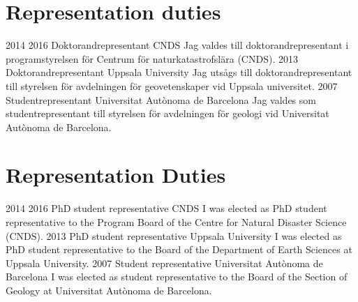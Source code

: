 \ifswedish
    \section{Representation duties}
    \position
        {2014 \textemdash{} 2016}
        {Doktorandrepresentant}
        {CNDS}
        {Jag valdes till doktorandrepresentant i programstyrelsen för Centrum för naturkatastrofslära (CNDS).}
    \position
        {2013}
        {Doktorandrepresentant}
        {Uppsala University}
        {Jag utsågs till doktorandrepresentant till styrelsen för avdelningen för geovetenskaper vid Uppsala universitet.}
    \position
        {2007}
        {Studentrepresentant}
        {Universitat Autònoma de Barcelona}
        {Jag valdes som studentrepresentant till styrelsen för avdelningen för geologi vid Universitat Autònoma de Barcelona.}
\else
    \section{Representation Duties}
    \position
        {2014 \textemdash{} 2016}
        {PhD student representative}
        {CNDS}
        {I was elected as PhD student representative to the Program Board of the Centre for Natural Disaster Science (CNDS).}
    \position
        {2013}
        {PhD student representative}
        {Uppsala University}
        {I was elected as PhD student representative to the Board of the Department of Earth Sciences at Uppsala University.}
    \position
        {2007}
        {Student representative}
        {Universitat Autònoma de Barcelona}
        {I was elected as student representative to the Board of the Section of Geology at Universitat Autònoma de Barcelona.}
\fi
